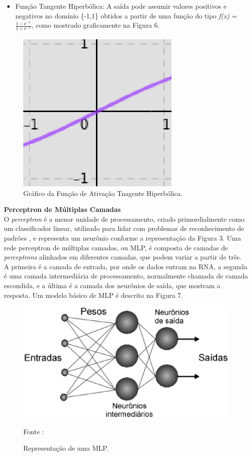     \begin{itemize}
        \item Função Tangente Hiperbólica: A saída pode assumir valores positivos e negativos no domínio \{-1,1\} obtidos a partir de uma função do tipo \textit{f(x)} = $\frac{1-\mathrm{e}^{-\textit{x}}}{1+\mathrm{e}^{-\textit{x}}}$, como mostrado graficamente na Figura 6.
    \end{itemize}
    
            \begin{figure}[ht]
                \centering
                \label{fig06}
                    \includegraphics[keepaspectratio=true, scale=0.5]{editaveis/images/graficotngh.eps}
                \caption{Gráfico da Função de Ativação Tnagente Hiperbólica.}
            \end{figure}

    \noindent
    \textbf{Perceptron de Múltiplas Camadas} \\ 

    O \textit{perceptron} é a menor unidade de processamento, criado primordialmente como um classificador linear, utilizado para lidar com problemas de reconhecimento de padrões \cite{rosenblatt1958}, e representa um neurônio conforme a representação da Figura 3. Uma rede perceptron de múltiplas camadas, ou MLP, é composta de camadas de \textit{perceptrons} alinhados em diferentes camadas, que podem variar a partir de três. A primeira é a camada de entrada, por onde os dados entram na RNA, a segunda é uma camada intermediária de processamento, normalmente chamada de camada escondida, e a última é a camada dos neurônios de saída, que mostram a resposta. Um modelo básico de MLP é descrito na Figura 7.

    \begin{figure}[ht]
        \centering
        \label{fig07}
            \includegraphics[keepaspectratio=true, scale=0.5]{editaveis/images/mlp.eps}
        \caption{Representação de uma MLP.}
        Fonte : \cite{tafner1998}
    \end{figure}


